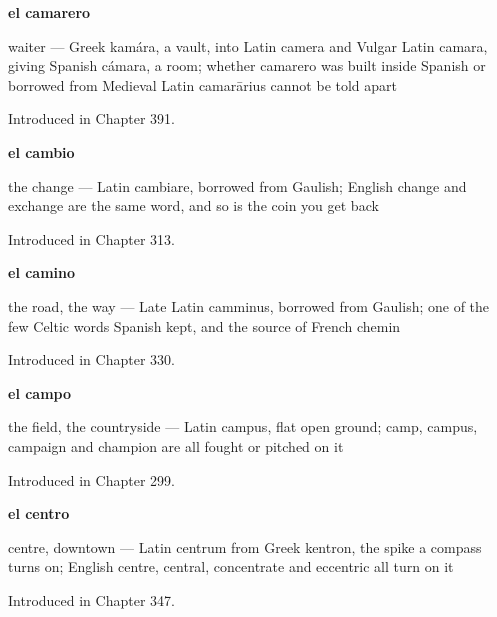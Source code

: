 \noindent\begin{minipage}[t]{\linewidth}
\raggedright
\textbf{el camarero}\par
\small waiter — Greek kamára, a vault, into Latin camera and Vulgar Latin camara, giving Spanish cámara, a room; whether camarero was built inside Spanish or borrowed from Medieval Latin camarārius cannot be told apart\par
\footnotesize Introduced in Chapter 391.
\end{minipage}\par\medskip

\noindent\begin{minipage}[t]{\linewidth}
\raggedright
\textbf{el cambio}\par
\small the change — Latin cambiare, borrowed from Gaulish; English change and exchange are the same word, and so is the coin you get back\par
\footnotesize Introduced in Chapter 313.
\end{minipage}\par\medskip

\noindent\begin{minipage}[t]{\linewidth}
\raggedright
\textbf{el camino}\par
\small the road, the way — Late Latin camminus, borrowed from Gaulish; one of the few Celtic words Spanish kept, and the source of French chemin\par
\footnotesize Introduced in Chapter 330.
\end{minipage}\par\medskip

\noindent\begin{minipage}[t]{\linewidth}
\raggedright
\textbf{el campo}\par
\small the field, the countryside — Latin campus, flat open ground; camp, campus, campaign and champion are all fought or pitched on it\par
\footnotesize Introduced in Chapter 299.
\end{minipage}\par\medskip

\noindent\begin{minipage}[t]{\linewidth}
\raggedright
\textbf{el centro}\par
\small centre, downtown — Latin centrum from Greek kentron, the spike a compass turns on; English centre, central, concentrate and eccentric all turn on it\par
\footnotesize Introduced in Chapter 347.
\end{minipage}\par\medskip


